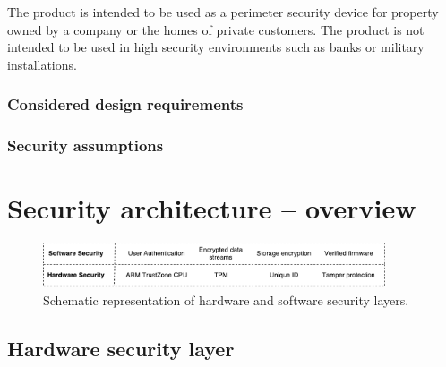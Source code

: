 \documentclass[10pt]{article}
\begin{document}
        The product is intended to be used as a perimeter security device for
        property owned by a company or the homes of private customers. The
        product is not intended to be used in high security environments such
        as banks or military installations.

      \subsubsection{Considered design requirements}


      \subsubsection{Security assumptions}

         \begin{itemize}
         \end{itemize}

  \section{Security architecture -- overview}

    \begin{figure}[H]
      \center
      \includegraphics[width=0.9\textwidth]{input/security_layers.pdf}
      \caption{Schematic representation of hardware and software security layers.}
    \end{figure}

    \subsection{Hardware security layer}
\end{document}
